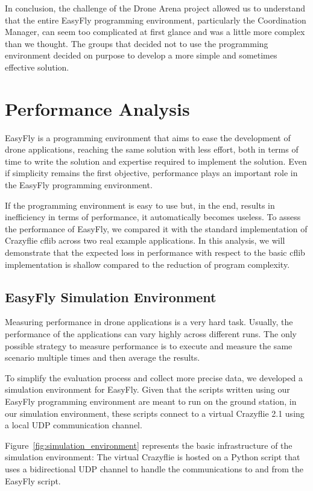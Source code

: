 In conclusion, the challenge of the Drone Arena project allowed us to understand that the entire EasyFly programming environment, particularly the Coordination Manager, can seem too complicated at first glance and was a little more complex than we thought.
The groups that decided not to use the programming environment decided on purpose to develop a more simple and sometimes effective solution.


\section{Performance Analysis}\label{sec:performance_analysis}

EasyFly is a programming environment that aims to ease the development of drone applications, reaching the same solution with less effort, both in terms of time to write the solution and expertise required to implement the solution.
Even if simplicity remains the first objective, performance plays an important role in the EasyFly programming environment.

If the programming environment is easy to use but, in the end, results in inefficiency in terms of performance, it automatically becomes useless.
To assess the performance of EasyFly, we compared it with the standard implementation of Crazyflie cflib across two real example applications.
In this analysis, we will demonstrate that the expected loss in performance with respect to the basic cflib implementation is shallow compared to the reduction of program complexity.

\subsection{EasyFly Simulation Environment}\label{subsec:simulation_environment}
Measuring performance in drone applications is a very hard task. 
Usually, the performance of the applications can vary highly across different runs.
The only possible strategy to measure performance is to execute and measure the same scenario multiple times and then average the results.

To simplify the evaluation process and collect more precise data, we developed a simulation environment for EasyFly.
Given that the scripts written using our EasyFly programming environment are meant to run on the ground station, 
in our simulation environment, these scripts connect to a virtual Crazyflie 2.1 using a local UDP communication channel.

Figure~\ref{fig:simulation_environment} represents the basic infrastructure of the simulation environment: 
The virtual Crazyflie is hosted on a Python script that uses a bidirectional UDP channel to handle the communications to and from the EasyFly script.


